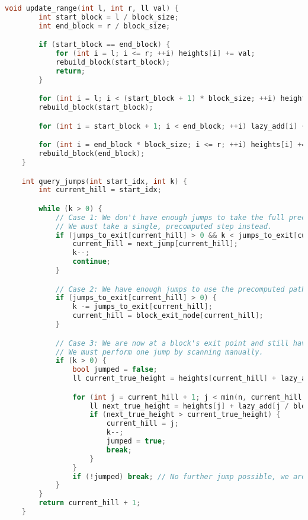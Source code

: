 \documentclass[10pt]{article}
\begin{document}
\begin{itemize}
{\begin{lstlisting}[language=C++, basicstyle=\ttfamily\fontsize{7pt}{8pt}\selectfont]
    void update_range(int l, int r, ll val) {
        int start_block = l / block_size;
        int end_block = r / block_size;

        if (start_block == end_block) {
            for (int i = l; i <= r; ++i) heights[i] += val;
            rebuild_block(start_block);
            return;
        }

        for (int i = l; i < (start_block + 1) * block_size; ++i) heights[i] += val;
        rebuild_block(start_block);

        for (int i = start_block + 1; i < end_block; ++i) lazy_add[i] += val;

        for (int i = end_block * block_size; i <= r; ++i) heights[i] += val;
        rebuild_block(end_block);
    }

    int query_jumps(int start_idx, int k) {
        int current_hill = start_idx;

        while (k > 0) {
            // Case 1: We don't have enough jumps to take the full precomputed path
            // We must take a single, precomputed step instead.
            if (jumps_to_exit[current_hill] > 0 && k < jumps_to_exit[current_hill]) {
                current_hill = next_jump[current_hill];
                k--;
                continue;
            }

            // Case 2: We have enough jumps to use the precomputed path.
            if (jumps_to_exit[current_hill] > 0) {
                k -= jumps_to_exit[current_hill];
                current_hill = block_exit_node[current_hill];
            }

            // Case 3: We are now at a block's exit point and still have jumps left
            // We must perform one jump by scanning manually.
            if (k > 0) {
                bool jumped = false;
                ll current_true_height = heights[current_hill] + lazy_add[current_hill / block_size];

                for (int j = current_hill + 1; j < min(n, current_hill + 1 + MAX_JUMP_DIST); ++j) {
                    ll next_true_height = heights[j] + lazy_add[j / block_size];
                    if (next_true_height > current_true_height) {
                        current_hill = j;
                        k--;
                        jumped = true;
                        break;
                    }
                }
                if (!jumped) break; // No further jump possible, we are stuck.
            }
        }
        return current_hill + 1;
    }


\end{lstlisting}}
\end{itemize}
\end{document}
